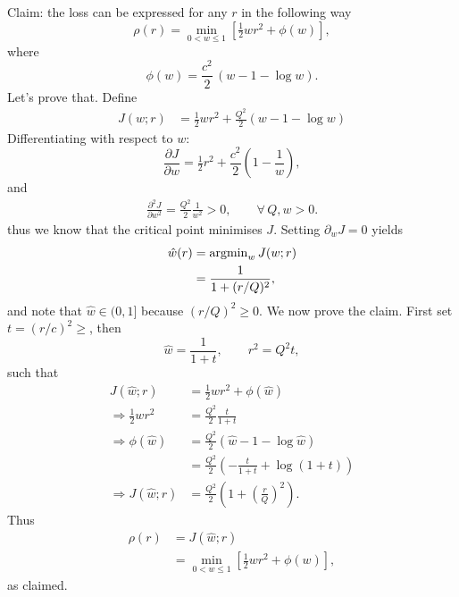 \documentclass[11pt]{article}
\begin{document}
Claim: the loss can be expressed for any $r$ in the following way
\begin{equation}
    \rho(r) = \min_{0<w\leq1} \left[ \tfrac{1}{2} w r^2 + \phi(w) \right],
\end{equation}
where
\begin{equation}
    \phi(w) = \frac{c^2}{2}\,(w - 1 - \log w).
\end{equation}
Let's prove that. Define
\begin{align}
    J\left( w ; r \right) &= \tfrac{1}{2} w r^2 + \tfrac{Q^2}{2} \left( w - 1 - \log{w}\right)
\end{align}
Differentiating with respect to $w$:
\begin{equation}
    \frac{\partial J}{\partial w} 
    = \tfrac{1}{2}r^2 + \frac{c^2}{2}\left(1 - \frac{1}{w}\right),
\end{equation}
and
\begin{align}
    \frac{\partial^2 J}{\partial w^2} = \frac{Q^2}{2} \frac{1}{w^2} > 0, \qquad \forall \, Q,w > 0.
\end{align}
thus we know that the critical point minimises $J$.
Setting $\partial_w J=0$ yields
\begin{align}
    \hat{w}(r) &= {\rm argmin}_w \, J (w ; r) \\
    &= \frac{1}{1 + (r/Q)^2},
\end{align}
and note that $\hat{w} \in (0, 1]$ because $(r/Q)^2 \geq 0$.
We now prove the claim. First set $t = (r/c)^2 \geq$, then
\begin{equation}
    \hat{w} = \frac{1}{1+t}, \qquad r^2 = Q^2 t,
\end{equation}
such that
\begin{align}
    J (\hat{w} ; r) &= \tfrac{1}{2} w r^2 + \phi(\hat{w}) \\
    \Rightarrow \tfrac{1}{2} w r^2 &= \frac{Q^2}{2} \frac{t}{1 + t} \\
    \Rightarrow \phi(\hat{w}) &= \frac{Q^2}{2} \left( \hat{w} - 1 - \log{\hat{w}} \right) \\
    &= \frac{Q^2}{2} \left( -\frac{t}{1 + t} + \log(1 + t) \right) \\
    \Rightarrow J (\hat{w} ; r) &= \frac{Q^2}{2} \left( 1 + \left( \tfrac{r}{Q}\right)^2 \right).
\end{align}
Thus
\begin{align}
    \rho(r) &= J ( \hat{w} ; r ) \\
    &= \min_{0<w\leq1} \left[ \tfrac{1}{2} w r^2 + \phi(w) \right],
\end{align}
as claimed.
\end{document}
